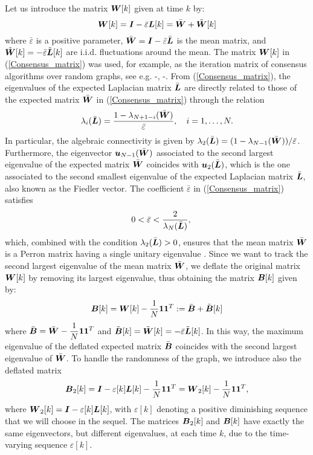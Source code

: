 \documentclass[10pt,twocolumn]{IEEEtran}
\def\bB{\mbox{\boldmath $B$}}
\def\bI{\mbox{\boldmath $I$}}
\def\bL{\mbox{\boldmath $L$}}
\def\bW{\mbox{\boldmath $W$}}
\def\bu{\mbox{\boldmath $u$}}
\begin{document}
Let us introduce the matrix $\bW[k]$ given at time $k$ by:
\begin{equation}\label{Consensus_matrix}
\bW[k]=\bI-\bar{\varepsilon}\bL[k]=\bar{\bW}+\tilde{\bW}[k]
\end{equation}
where $\bar{\varepsilon}$ is a positive parameter, $\bar{\bW}=\bI-\bar{\varepsilon}\bar{\bL}$ is the mean matrix, and $\tilde{\bW}[k]=-\bar{\varepsilon}\tilde{\bL}[k]$ are i.i.d. fluctuations around the mean.
The matrix $\bW[k]$ in (\ref{Consensus_matrix}) was used, for example, as the iteration matrix of consensus algorithms over random graphs, see e.g. \cite{Tahbaz-Salehi-Jadb1}-\cite{Tahbaz-Salehi-Jadb2}, \cite{Kar-Moura}-\cite{Kar-Moura2}.
From (\ref{Consensus_matrix}), the eigenvalues of the expected Laplacian matrix $\bar{\bL}$ are directly related to those of the expected matrix $\bar{\bW}$ in (\ref{Consensus_matrix}) through the relation
\begin{equation}\label{eigenv_Lapl_cons}
\lambda_i(\bar{\bL})=\frac{1-\lambda_{N+1-i}(\bar{\bW})}{\bar{\varepsilon}}, \quad i=1,\ldots,N.
\end{equation}
In particular, the algebraic connectivity is given by $\lambda_2(\bar{\bL})=(1-\lambda_{N-1}(\bar{\bW}))/\bar{\varepsilon}$. Furthermore, the eigenvector $\bu_{N-1}(\bar{\bW})$ associated to the second largest eigenvalue of the expected matrix $\bar{\bW}$ coincides with  $\bu_{2}(\bar{\bL})$, which is the one associated to the second smallest eigenvalue of the expected Laplacian matrix $\bar{\bL}$, also known as the Fiedler vector.
The coefficient $\bar{\varepsilon}$ in (\ref{Consensus_matrix}) satisfies
\begin{eqnarray}\label{Condition}
\quad 0<\bar{\varepsilon}<\frac{2}{\lambda_N(\bar{\bL})},
\end{eqnarray}
which, combined with the condition $\lambda_2(\bar{\bL})>0$, ensures that the mean matrix $\bar{\bW}$ is a Perron matrix having a single unitary eigenvalue \cite{Olfati1}. Since we want to track the second largest eigenvalue of the mean matrix $\bar{\bW}$, we deflate the original matrix $\bW[k]$ by removing its largest eigenvalue, thus obtaining the matrix $\bB[k]$ given by:
\begin{align}\label{Defl_matrix2}
\bB[k] =\bW[k]-\frac{1}{N}\mathbf{1}\mathbf{1}^T:=\bar{\bB}+\tilde{\bB}[k]
\end{align}
where $\displaystyle \bar{\bB}=\bar{\bW}-\frac{1}{N}\mathbf{1}\mathbf{1}^T$ and $\tilde{\bB}[k]=\tilde{\bW}[k]=-\bar{\varepsilon}\tilde{\bL}[k]$. In this way, the maximum eigenvalue of the deflated expected matrix $\bar{\bB}$ coincides with the second largest eigenvalue of $\bar{\bW}$.
To handle the randomness of the graph, we introduce also the deflated matrix
\begin{align}\label{Defl_matrix3}
\bB_2[k]=\bI-\varepsilon[k]\bL[k]-\frac{1}{N}\mathbf{1}\mathbf{1}^T=\bW_2[k]-\frac{1}{N}\mathbf{1}\mathbf{1}^T,
\end{align}
where $\bW_2[k]=\bI-\varepsilon[k]\bL[k]$, with $\varepsilon[k]$ denoting a positive diminishing sequence that we will choose in the sequel. The matrices $\bB_2[k]$ and $\bB[k]$ have exactly the same eigenvectors, but different eigenvalues,
at each time $k$, due to the time-varying sequence $\varepsilon[k]$.
\end{document}
